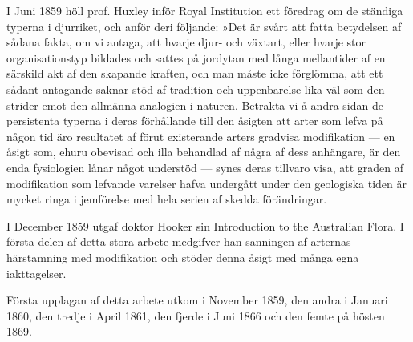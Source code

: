 I Juni 1859 höll prof. Huxley inför Royal Institution ett föredrag om de ständiga typerna i djurriket, och anför deri följande: »Det är svårt att fatta betydelsen af sådana fakta, om vi antaga, att hvarje djur- och växtart, eller hvarje stor organisationstyp bildades och sattes på jordytan med långa mellantider af en särskild akt af den skapande kraften, och man måste icke förglömma, att ett sådant antagande saknar stöd af tradition och uppenbarelse lika väl som den strider emot den allmänna analogien i naturen. Betrakta vi å andra sidan de persistenta typerna i deras förhållande till den åsigten att arter som lefva på någon tid äro resultatet af förut existerande arters gradvisa modifikation — en åsigt som, ehuru obevisad och illa behandlad af några af dess anhängare, är den enda fysiologien lånar något understöd — synes deras tillvaro visa, att graden af modifikation som lefvande varelser hafva undergått under den geologiska tiden är mycket ringa i jemförelse med hela serien af skedda förändringar.

I December 1859 utgaf doktor Hooker sin Introduction to the Australian Flora. I första delen af detta stora arbete medgifver han sanningen af arternas härstamning med modifikation och stöder denna åsigt med många egna iakttagelser.

Första upplagan af detta arbete utkom i November 1859, den andra i Januari 1860, den tredje i April 1861, den fjerde i Juni 1866 och den femte på hösten 1869.


